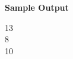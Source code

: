 \begin{flushleft}
{\color{red} \textbf{Sample Output}}
\end{flushleft}
\begin{flushleft}
13\\
8\\
10\\
\end{flushleft}

\newpage